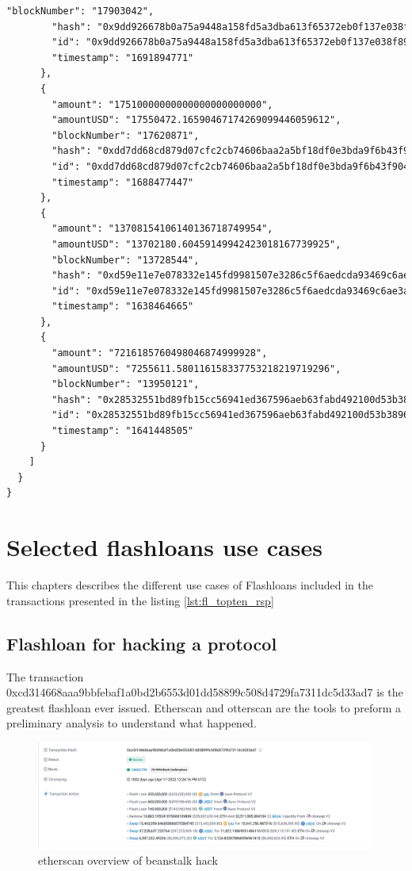 \documentclass[11pt,a4paper,titlepage]{scrartcl}
\begin{document}
\begin{lstlisting}[language=xml, caption={ JSON response for top 10 usd amount flashloans}, label={lst:fl_topten_rsp}, basicstyle=\ttfamily\scriptsize]
        "blockNumber": "17903042",
        "hash": "0x9dd926678b0a75a9448a158fd5a3dba613f65372eb0f137e038f89ba8c891435",
        "id": "0x9dd926678b0a75a9448a158fd5a3dba613f65372eb0f137e038f89ba8c8914353f02000006000000",
        "timestamp": "1691894771"
      },
      {
        "amount": "17510000000000000000000000",
        "amountUSD": "17550472.16590467174269099446059612",
        "blockNumber": "17620871",
        "hash": "0xdd7dd68cd879d07cfc2cb74606baa2a5bf18df0e3bda9f6b43f904f4f7bbdfc1",
        "id": "0xdd7dd68cd879d07cfc2cb74606baa2a5bf18df0e3bda9f6b43f904f4f7bbdfc17800000006000000",
        "timestamp": "1688477447"
      },
      {
        "amount": "13708154106140136718749954",
        "amountUSD": "13702180.60459149942423018167739925",
        "blockNumber": "13728544",
        "hash": "0xd59e11e7e078332e145fd9981507e3286c5f6aedcda93469c6ae3af46f5cdfe6",
        "id": "0xd59e11e7e078332e145fd9981507e3286c5f6aedcda93469c6ae3af46f5cdfe61b02000006000000",
        "timestamp": "1638464665"
      },
      {
        "amount": "7216185760498046874999928",
        "amountUSD": "7255611.580116158337753218219719296",
        "blockNumber": "13950121",
        "hash": "0x28532551bd89fb15cc56941ed367596aeb63fabd492100d53b3896b7ad9d5ce5",
        "id": "0x28532551bd89fb15cc56941ed367596aeb63fabd492100d53b3896b7ad9d5ce58200000006000000",
        "timestamp": "1641448505"
      }
    ]
  }
}
\end{lstlisting}

\newpage

\section{Selected flashloans use cases}

This chapters describes the different use cases of Flashloans included in the transactions presented in the listing \ref{lst:fl_topten_rsp}  

\subsection{Flashloan for hacking a protocol}
The transaction 0xcd314668aaa9bbfebaf1a0bd2b6553d01dd58899c508d4729fa7311dc5d33ad7 is the greatest flashloan ever issued. 
 Etherscan and otterscan are the  tools to preform a preliminary analysis to understand what happened.
 
 \begin{figure}[ht]
    \centering %
    \includegraphics[scale=0.5]{image/beanstalk/etherscan1.png}
    \caption{etherscan overview of beanstalk hack}
    \label{fig:beanstalk1}
\end{figure}
 
\end{document}
